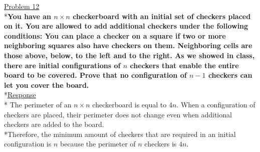\documentclass[12pt]{article}
\begin{document}
\noindent
\uline{Problem 12}
\\*\textbf{You have an $n\times n$ checkerboard with an initial set of checkers placed on it. You are allowed to add additional checkers under the following conditions: You can place a checker on a square if two or more neighboring squares also have checkers on them. Neighboring cells are those above, below, to the left and to the right. As we showed in class, there are initial configurations of $n$ checkers that enable the entire board
to be covered. Prove that no configuration of $n-1$ checkers can let you cover the board.}
\smallskip
\\*\uline{Response}
\\* The perimeter of an $n \times n$ checkerboard is equal to 4$n$. When a configuration of checkers are placed, their perimeter does not change even when additional checkers are added to the board.
\\*Therefore, the minimum amount of checkers that are required in an initial configuration is $n$ because the perimeter of $n$ checkers is $4n$. 
\end{document}
